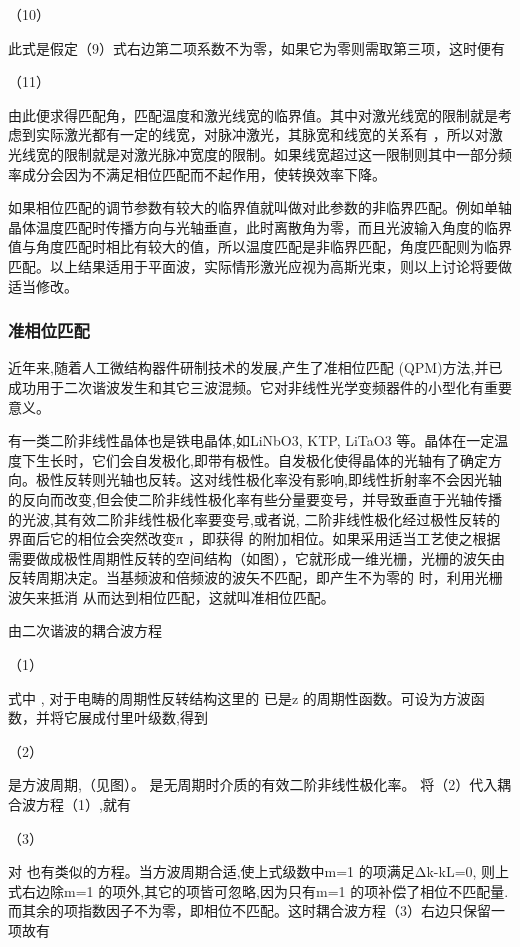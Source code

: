                                           （10）

此式是假定（9）式右边第二项系数不为零，如果它为零则需取第三项，这时便有

                                     （11）

由此便求得匹配角，匹配温度和激光线宽的临界值。其中对激光线宽的限制就是考虑到实际激光都有一定的线宽，对脉冲激光，其脉宽和线宽的关系有 ，所以对激光线宽的限制就是对激光脉冲宽度的限制。如果线宽超过这一限制则其中一部分频率成分会因为不满足相位匹配而不起作用，使转换效率下降。

如果相位匹配的调节参数有较大的临界值就叫做对此参数的非临界匹配。例如单轴晶体温度匹配时传播方向与光轴垂直，此时离散角为零，而且光波输入角度的临界值与角度匹配时相比有较大的值，所以温度匹配是非临界匹配，角度匹配则为临界匹配。以上结果适用于平面波，实际情形激光应视为高斯光束，则以上讨论将要做适当修改。

\subsubsection{准相位匹配}
近年来,随着人工微结构器件研制技术的发展,产生了准相位匹配 (QPM)方法,并已成功用于二次谐波发生和其它三波混频。它对非线性光学变频器件的小型化有重要意义。

有一类二阶非线性晶体也是铁电晶体,如LiNbO3, KTP, LiTaO3 等。晶体在一定温度下生长时，它们会自发极化,即带有极性。自发极化使得晶体的光轴有了确定方向。极性反转则光轴也反转。这对线性极化率没有影响,即线性折射率不会因光轴的反向而改变,但会使二阶非线性极化率有些分量要变号，并导致垂直于光轴传播的光波,其有效二阶非线性极化率要变号,或者说, 二阶非线性极化经过极性反转的界面后它的相位会突然改变π ，即获得  的附加相位。如果采用适当工艺使之根据需要做成极性周期性反转的空间结构（如图），它就形成一维光栅，光栅的波矢由反转周期决定。当基频波和倍频波的波矢不匹配，即产生不为零的 时，利用光栅波矢来抵消 从而达到相位匹配，这就叫准相位匹配。
     
由二次谐波的耦合波方程

                                     （1）

式中 , 对于电畴的周期性反转结构这里的 已是z 的周期性函数。可设为方波函数，并将它展成付里叶级数,得到

                      （2）

是方波周期,（见图）。 是无周期时介质的有效二阶非线性极化率。 将（2）代入耦合波方程（1）,就有

                           （3）

对 也有类似的方程。当方波周期合适,使上式级数中m=1 的项满足Δk-kL=0, 则上式右边除m=1 的项外,其它的项皆可忽略,因为只有m=1 的项补偿了相位不匹配量.而其余的项指数因子不为零，即相位不匹配。这时耦合波方程（3）右边只保留一项故有

